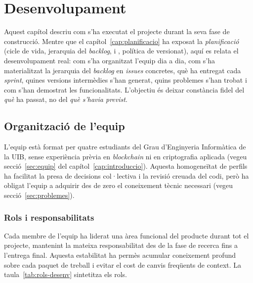 
\chapter{Desenvolupament}
\label{cap:desenvolupament}

Aquest capítol descriu com s'ha executat el projecte durant la seva fase de
construcció. Mentre que el capítol~\ref{cap:planificacio} ha exposat la
\emph{planificació} (cicle de vida, jerarquia del \emph{backlog}, 
i , política de versionat), aquí es relata el desenvolupament real:
com s'ha organitzat l'equip dia a dia, com s'ha materialitzat la jerarquia
del \emph{backlog} en \emph{issues} concretes, què ha entregat cada
\emph{sprint}, quines versions intermèdies s'han generat, quins problemes
s'han trobat i com s'han demostrat les funcionalitats. L'objectiu és deixar
constància fidel del \emph{què} ha passat, no del \emph{què s'havia
previst}.

\section{Organització de l'equip}
\label{sec:organitzacio-equip}

L'equip està format per quatre estudiants del Grau d'Enginyeria
Informàtica de la \ac{UIB}, sense experiència prèvia en
\emph{blockchain} ni en criptografia aplicada (vegeu
secció~\ref{sec:equip} del capítol~\ref{cap:introduccio}). Aquesta
homogeneïtat de perfils ha facilitat la presa de decisions
col·lectiva i la revisió creuada del codi, però ha obligat l'equip a
adquirir des de zero el coneixement tècnic necessari (vegeu
secció~\ref{sec:problemes}).

\subsection{Rols i responsabilitats}

Cada membre de l'equip ha liderat una àrea funcional del producte
durant tot el projecte, mantenint la mateixa responsabilitat des de
la fase de recerca fins a l'entrega final. Aquesta estabilitat ha
permès acumular coneixement profund sobre cada paquet de treball i
evitar el cost de canvis freqüents de context. La
taula~\ref{tab:rols-desenv} sintetitza els rols.

